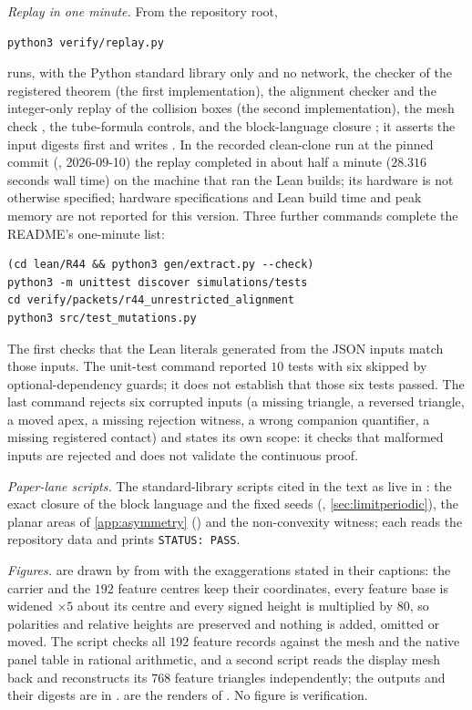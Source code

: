 \emph{Replay in one minute.} From the repository root,
\begin{verbatim}
python3 verify/replay.py
\end{verbatim}
runs, with the Python standard library only and no network, the checker of the registered
theorem (the first implementation), the alignment checker and the integer-only replay of the
collision boxes (the second implementation), the mesh check ,
the tube-formula controls,  and the
block-language closure ; it asserts the
input digests first and writes . In the recorded clean-clone run
at the pinned commit (, 2026-09-10) the replay
completed in about half a minute ($28.316$
seconds wall time) on the machine that ran the Lean builds; its hardware is not otherwise
specified; hardware specifications and Lean build time and peak memory are not reported for this
version. Three
further commands complete the README's one-minute list:
\begin{verbatim}
(cd lean/R44 && python3 gen/extract.py --check)
python3 -m unittest discover simulations/tests
cd verify/packets/r44_unrestricted_alignment
python3 src/test_mutations.py
\end{verbatim}
The first checks that the Lean literals generated from the JSON inputs match those inputs. The
unit-test command reported $10$ tests with six skipped by optional-dependency guards; it does not
establish that those six tests passed. The last command rejects six corrupted inputs (a missing triangle, a reversed triangle, a moved apex, a
missing rejection witness, a wrong companion quantifier, a missing registered contact) and states
its own scope: it checks that malformed inputs are rejected and does not validate the continuous
proof.

\emph{Paper-lane scripts.} The standard-library scripts cited in the text as  live in
: the exact closure of the block language and the fixed seeds
(, \cref{sec:limitperiodic}), the planar areas of \cref{app:asymmetry}
() and the non-convexity witness; each reads the repository data and
prints \texttt{STATUS: PASS}.

\emph{Figures.}  are drawn by 
from  with the exaggerations stated in their captions: the carrier and
the $192$ feature centres keep their coordinates, every feature base is widened $\times 5$ about
its centre and every signed height is multiplied by $80$, so polarities and relative heights
are preserved and nothing is added, omitted or moved. The script checks all $192$ feature records
against the mesh and the native panel table in rational arithmetic, and a second script reads the
display mesh back and reconstructs its $768$ feature triangles independently; the outputs and their
digests are in .  are the renders of
. No figure is verification.

